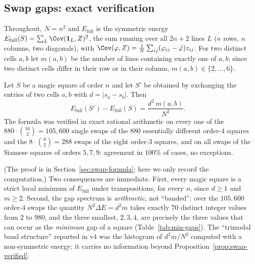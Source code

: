 
\subsection{Swap gaps: exact verification}
\label{sec:swap-gaps}

Throughout, $N=n^2$ and $E_{\mathrm{full}}$ is the symmetric energy
$E_{\mathrm{full}}(S)=\sum_{L}\Cov(\mathbf 1_L,Z)^2$, the sum running over all
$2n+2$ lines $L$ ($n$ rows, $n$ columns, two diagonals), with
$\Cov(\varphi,Z)=\frac1N\sum_{ij}(\varphi_{ij}-\bar\varphi)z_{ij}$.
For two distinct cells $a,b$ let $m(a,b)$ be the number of lines containing
exactly one of $a,b$; since two distinct cells differ in their row or in their
column, $m(a,b)\in\{2,\dots,6\}$.

\begin{proposition}
\label{prop:swap-verified}
Let $S$ be a magic square of order $n$ and let $S'$ be obtained by exchanging
the entries of two cells $a,b$ with $d=|s_a-s_b|$.  Then
\[
E_{\mathrm{full}}(S')-E_{\mathrm{full}}(S)=\frac{d^{2}\,m(a,b)}{N^{2}} .
\]
The formula was verified in exact rational arithmetic on every one of the
$880\cdot\binom{16}{2}=105{,}600$ single swaps of the $880$ essentially
different order-$4$ squares and the $8\cdot\binom 92=288$ swaps of the eight
order-$3$ squares, and on all swaps of the Siamese squares of orders $5,7,9$:
agreement in $100\%$ of cases, no exceptions.
\end{proposition}

(The proof is in Section~\ref{sec:swap-formula}; here we only record the
computation.)  Two consequences are immediate.  First, every magic square is a
strict local minimum of $E_{\mathrm{full}}$ under transpositions, for every
$n$, since $d\ge 1$ and $m\ge 2$.  Second, the gap spectrum is
\emph{arithmetic}, not ``banded'': over the $105{,}600$ order-$4$ swaps the
quantity $N^2\Delta E=d^2m$ takes exactly $70$ distinct integer values from $2$
to $980$, and the three smallest, $2,3,4$, are precisely the three values that
can occur as the \emph{minimum} gap of a square
(Table~\ref{tab:min-gaps}).  The ``trimodal band structure'' reported in v4
was the histogram of $d^2m/N^2$ computed with a non-symmetric energy; it
carries no information beyond Proposition~\ref{prop:swap-verified}.

